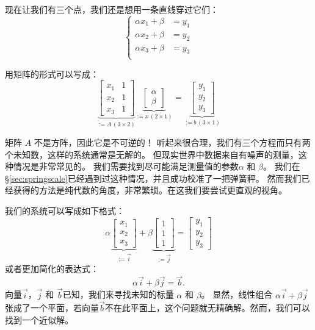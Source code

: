 \documentclass[notitlepage,oneside]{book}
\begin{document}
现在让我们有三个点，我们还是想用一条直线穿过它们：
$$
\left\{
\begin{split}
\alpha x_1 + \beta &= y_1\\
\alpha x_2 + \beta &= y_2\\
\alpha x_3 + \beta &= y_3\\
\end{split}
\right.
$$

用矩阵的形式可以写成：
$$
\underbrace{\begin{bmatrix}x_1  & 1 \\ x_2 & 1 \\x_3 & 1 \end{bmatrix} }_{:= A\,(3\times 2)}
\underbrace{\begin{bmatrix} \alpha \\ \beta \end{bmatrix}}_{:=x\,(2\times 1)} = \underbrace{\begin{bmatrix} y_1 \\ y_2 \\ y_3 \end{bmatrix}}_{:=b\, (3\times 1)}
$$

矩阵 $A$ 不是方阵，因此它是不可逆的！
听起来很合理，我们有三个方程而只有两个未知数，这样的系统通常是无解的。
但现实世界中数据来自有噪声的测量，这种情况是非常常见的。
我们需要找到尽可能满足测量值的参数$\alpha$ 和 $\beta$。
我们在\S\ref{sec:springscale}已经遇到过这种情况，并且成功校准了一把弹簧秤。
然而我们已经获得的方法是纯代数的角度，非常繁琐。在这我们要尝试更直观的视角。

我们的系统可以写成如下格式：
$$
\alpha \underbrace{\begin{bmatrix}x_1  \\ x_2 \\x_3  \end{bmatrix} }_{:=\vec{i}}
+\beta \underbrace{\begin{bmatrix}1 \\ 1 \\1 \end{bmatrix} }_{:=\vec{j}} = 
\begin{bmatrix}y_1\\y_2\\y_3\end{bmatrix}
$$
或者更加简化的表达式：
$$
\alpha \vec{i} + \beta\vec{j} = \vec{b}.
$$
向量$\vec i$，$\vec j$ 和 $\vec b$已知，我们来寻找未知的标量 $\alpha$ 和 $\beta$。
显然，线性组合 $\alpha \vec{i} + \beta\vec{j}$ 张成了一个平面，若向量$\vec b$不在此平面上，这个问题就无精确解。然而，我们可以找到一个近似解。
\end{document}
